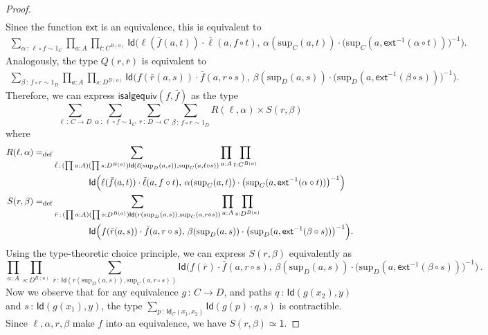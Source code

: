 \documentclass[10pt,a4paper,oneside,reqno]{amsart}
\theoremstyle{mythm}
\theoremstyle{mydef}
\theoremstyle{myrmk}
\newcommand{\defeq}{=_{\mathrm{def}}}
\newcommand{\co}{\,{:}\,}
\newcommand{\com}{\circ}
\newcommand{\ct}{\cdot}
\newcommand{\ext}{\mathsf{ext}}
\newcommand{\one}{\mathsf{1}}
\newcommand{\Id}{\mathsf{Id}}
\renewcommand{\sup}{\mathrm{sup}}
\begin{document}
\begin{proof}
\begin{align*}
\end{align*}
Since the function $\ext$ is an equivalence, this is equivalent to
\begin{align*}
\sum_{ \alpha \co \ell \circ f \sim 1{_C}} \prod_{a:A} \prod_{t: C^{B(a)}} 
	\Id\Big(\ell(\bar{f}(a,t)) \ct \bar{\ell}(a, f \com t),\, \alpha(\sup_C(a,t)) \ct \big(\sup_C(a, \ext^{-1}(\alpha \circ t))\big)^{-1}\Big).
\end{align*}
Analogously, the type $Q(r,\bar{r})$ is equivalent to
\begin{align*}
\sum_{ \beta \co f \com r \sim 1{_D}} \prod_{a:A} \prod_{s: D^{B(a)}} 
\Id\Big(f(\bar{r}(a,s)) \ct \bar{f}(a, r \com s),\, \beta(\sup_D(a,s)) \ct \big(\sup_D(a,\ext^{-1}(\beta \circ s))\big)^{-1}\Big).
\end{align*}
Therefore, we can express $\mathsf{isalgequiv}(f,\bar{f})$ as the type
\[ \sum_{\ell \co C\to D} \sum_{\alpha \co \ell \circ f \sim 1_C} \sum_{r \co D\to C} \sum_{\beta \co f \circ r \sim 1_D}
	R(\ell,\alpha) \times S(r,\beta)\]
where
\begin{align*}
R(\ell,\alpha) \defeq& \sum_{\bar{\ell} \co (\prod a:A) (\prod s:D^{B(a)}) \Id(\ell(\sup_D(a,s)), \sup_C(a,\ell \circ s))}
	 \prod_{a:A}\prod_{t: C^{B(a)}}\\
		&\strut\qquad\qquad \Id\Big(\ell(\bar{f}(a,t)) \ct \bar{\ell}(a, f \com t),\, \alpha(\sup_C(a,t)) \ct \big(\sup_C(a,\ext^{-1}(\alpha \circ t))\big)^{-1}\Big) \\
S(r,\beta) \defeq& \sum_{\bar{r} \co (\prod a:A) (\prod s:D^{B(a)}) \Id(r(\sup_D(a,s)), \sup_C(a,r\circ s))}
	 \prod_{a:A}\prod_{s: D^{B(a)}}\\
	 		&\strut\qquad\qquad \Id\Big(f(\bar{r}(a,s)) \ct \bar{f}(a, r \com s),\, \beta(\sup_D(a,s)) \ct \big(\sup_D(a,\ext^{-1}(\beta \circ s))\big)^{-1}\Big).
\end{align*}
Using the type-theoretic choice principle, we can express $S(r,\beta)$ equivalently as
\[  
 \prod_{a:A}\prod_{s: D^{B(a)}}
\sum_{\bar{r} \co \Id(r(\sup_D(a,s)), \sup_C(a,r \circ s))}
\Id\Big(f(\bar{r}) \ct \bar{f}(a, r \com s) ,\, \beta(\sup_D(a,s)) \ct \big(\sup_D(a,\ext^{-1}(\beta \circ s))\big)^{-1}\Big) \, .
\]
Now we observe that for any equivalence $g \co C \to D$, and paths $q \co \Id(g(x_2),y)$ and $s \co \Id(g(x_1),y)$, the type $\sum_{p \co \Id_C(x_1,x_2)} \Id(g(p) \ct q,s)$ is contractible. Since $\ell, \alpha, r, \beta$ make $f$ into an equivalence, we have $S(r,\beta) \simeq \one$.


\end{proof}
\end{document}
